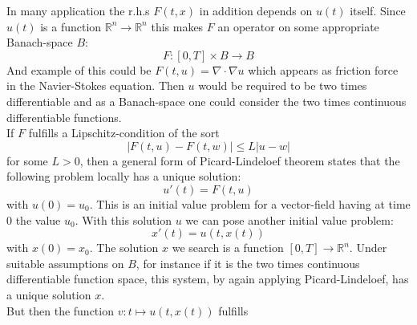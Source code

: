 \documentclass[17pt]{extarticle}
\begin{document}
In many application the r.h.s $F(t,x)$ in addition depends on $u(t)$ itself. Since $u(t)$ is a function $\mathbb{R}^n\rightarrow\mathbb{R}^n$ this makes $F$ an operator on some appropriate Banach-space $B$:
$$
F:[0,T]\times B\rightarrow B
$$
And example of this could be $F(t,u)=\nabla\cdot\nabla u$ which appears as friction force in the Navier-Stokes equation. Then $u$ would be required to be two times differentiable and as a Banach-space one could consider the two times continuous differentiable functions.\\
If $F$ fulfills a Lipschitz-condition of the sort
$$
|F(t,u)-F(t,w)|\leq L|u-w|
$$
for some $L>0$, then a general form of Picard-Lindeloef theorem states that the following problem locally has a unique solution:
\begin{equation} \label{b_space_problem}
	u'(t)=F(t,u)
\end{equation}
with $u(0)=u_0$.
This is an initial value problem for a vector-field having at time $0$ the value $u_0$.
With this solution $u$ we can pose another initial value problem:
\begin{equation} 
	x'(t)=u(t,x(t))
\end{equation}
with $x(0)=x_0$.
The solution $x$ we search is a function $[0,T]\rightarrow\mathbb{R}^n$.
Under suitable assumptions on $B$, for instance if it is the two times continuous differentiable function space, this system, by again applying Picard-Lindeloef, has a unique solution $x$.\\
But then the function $v:t\mapsto u(t,x(t))$ fulfills
\end{document}
